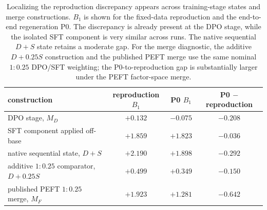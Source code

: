 \begin{table}[!htbp]
\centering
\small
\begin{tabular}{lccc}
\toprule
construction & reproduction $B_1$ & P0 $B_1$ & P0 $-$ reproduction \\
\midrule
DPO stage, $M_D$ & $+0.132$ & $-0.075$ & $-0.208$ \\
SFT component applied off-base & $+1.859$ & $+1.823$ & $-0.036$ \\
native sequential state, $D+S$ & $+2.190$ & $+1.898$ & $-0.292$ \\
additive $1{:}0.25$ comparator, $D+0.25S$ & $+0.499$ & $+0.349$ & $-0.150$ \\
published PEFT $1{:}0.25$ merge, $M_F$ & $+1.923$ & $+1.281$ & $-0.642$ \\
\bottomrule
\end{tabular}
\caption{
Localizing the reproduction discrepancy appears across training-stage states and merge constructions.
$B_1$ is shown for the fixed-data reproduction and the end-to-end regeneration P0.
The discrepancy is already present at the DPO stage, while the isolated SFT component is very similar across runs.
The native sequential $D+S$ state retains a moderate gap.
For the merge diagnostic, the additive $D+0.25S$ construction and the published PEFT merge use the same nominal $1{:}0.25$ DPO/SFT weighting; the P0-to-reproduction gap is substantially larger under the PEFT factor-space merge.
}
\label{tab:paraphrase-stage}
\end{table}